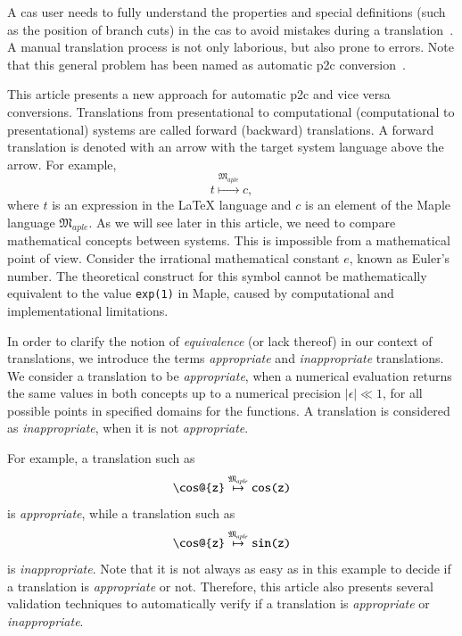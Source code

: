 \documentclass[a4paper,11pt]{article}
\newcommand{\Maple}{Maple}
\newcommand{\langMaple}{\mathfrak{M}_{aple}}
\theoremstyle{defTheoStyle}
\theoremstyle{defExampStyle}
\begin{document}
	A \gls*{cas} user needs to fully understand the properties and special definitions (such as the position of branch cuts) in the \gls*{cas} to avoid mistakes during a translation~\parencite{Maple:Cuts}. A manual translation process is not only laborious, but also prone to errors. Note that this general problem has been named as automatic \gls*{p2c} conversion~\parencite{POM-Tagger}.
	
	This article presents a new approach for automatic \gls*{p2c} and vice versa conversions. Translations from presentational to computational (computational to presentational) systems are called forward (backward) translations. A forward translation is denoted with an arrow with the target system language above the arrow. For example,
	\begin{equation*}
		t \overset{\langMaple}{\mapsto} c,
	\end{equation*}
	where $t$ is an expression in the \LaTeX{} language and $c$ is an element of the \Maple{} language $\langMaple$. As we will see later in this article, we need to compare mathematical concepts between systems. This is impossible from a mathematical point of view. Consider the irrational mathematical constant $e$, known as Euler's number. The theoretical construct for this symbol cannot be mathematically equivalent to the value \verb|exp(1)| in \Maple, caused by computational and implementational limitations. 
	
	In order to clarify the notion of \textit{equivalence} (or lack thereof) in our context of translations,
	we introduce the terms \textit{appropriate} and \textit{inappropriate} translations. 
	We consider a translation to be {\it appropriate}, when a numerical evaluation returns the 
	same values in both concepts up to a numerical precision $|\epsilon|\ll 1$, for all possible 
	points in specified domains for the functions.
	A translation is considered as {\it inappropriate}, when it is not {\it appropriate}.
	
	For example, a translation such as
	\begin{equation}\label{eq:cos-def}
	\verb|\cos@{z}| \overset{\langMaple}{\mapsto} \verb|cos(z)|
	\end{equation}
	is \textit{appropriate}, while a translation such as
	\begin{equation}
	\verb|\cos@{z}| \overset{\langMaple}{\mapsto} \verb|sin(z)|
	\end{equation}
	is \textit{inappropriate}. Note that it is not always as easy as in this example to decide if a translation is {\it appropriate} or not. Therefore, this article also presents several validation techniques to automatically verify if a translation is {\it appropriate} or {\it inappropriate}. 
	
\end{document}
